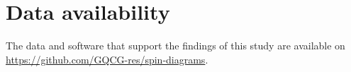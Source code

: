 \documentclass[journal=jctc,manuscript=article]{achemso}
\begin{document}
\section*{Data availability}
    The data and software that support the findings of this study are available on \url{https://github.com/GQCG-res/spin-diagrams}.



\end{document}
